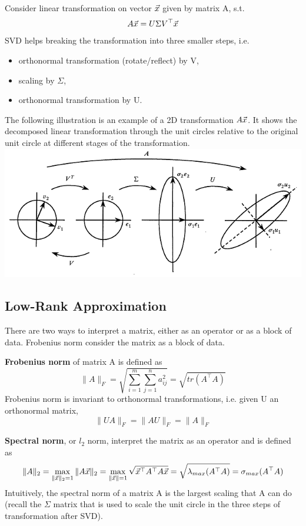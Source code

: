 \begin{remark}
	Consider linear transformation on vector $\vec{x}$ given by matrix A, s.t.
	\[
	A\vec{x} = U \Sigma V^\top \vec{x}
	\]
	SVD helps breaking the transformation into three smaller steps, i.e.
	\begin{itemize}
		\item orthonormal transformation (rotate/reflect) by V,
		\item scaling by $\Sigma$,
		\item orthonormal transformation by U.
	\end{itemize}
	The following illustration is an example of a 2D transformation $A\vec{x}$. It shows the decomposed linear transformation through the unit circles relative to the original unit circle at different stages of the transformation.\\
	\includegraphics[scale=0.7]{img/svd1.png}
\end{remark}

\newpage
\subsection{Low-Rank Approximation} %
\label{sub:low_rank_approximation}

\begin{definition}
There are two ways to interpret a matrix, either as an operator or as a block of data. Frobenius norm consider the matrix as a block of data.
	
	\noindent\textbf{Frobenius norm} of matrix A is defined as
	\[
\|A\|_F = \sqrt{\sum_{i=1}^m\sum_{j=1}^na_{ij}^2} = \sqrt{tr(A^\top A)}
	\]
	Frobenius norm is invariant to orthonormal transformations, i.e. given U an orthonormal matrix,
	\[
\|UA\|_F = \|AU\|_F = \|A\|_F
	\]

	\noindent\textbf{Spectral norm}, or $l_2$ norm, interpret the matrix as an operator and is defined as
	\[
\|A\|_2 = \max_{\|\vec{x}\|_2=1}\|A\vec{x}\|_2 = \max_{\|\vec{x}\|=1}\sqrt{\vec{x}^\top A^\top A\vec{x}} = \sqrt{\lambda_{max}(A^\top A)} = \sigma_{max}(A^\top A)
	\]
	Intuitively, the spectral norm of a matrix A is the largest scaling that A can do (recall the $\Sigma$ matrix that is used to scale the unit circle in the three steps of transformation after SVD).
\end{definition}

